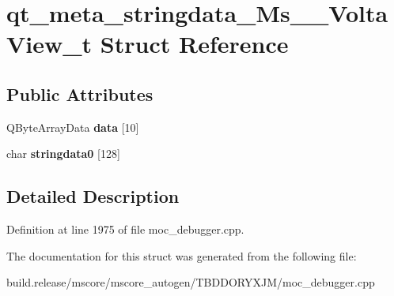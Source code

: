 \hypertarget{structqt__meta__stringdata___ms_____volta_view__t}{}\section{qt\+\_\+meta\+\_\+stringdata\+\_\+\+Ms\+\_\+\+\_\+\+Volta\+View\+\_\+t Struct Reference}
\label{structqt__meta__stringdata___ms_____volta_view__t}
\subsection*{Public Attributes}
\begin{DoxyCompactItemize}
\item 
\mbox{\label{structqt__meta__stringdata___ms_____volta_view__t_a91dc140ea4571e1aa9662913749326c9}} 
Q\+Byte\+Array\+Data {\bfseries data} \mbox{[}10\mbox{]}
\item 
\mbox{\label{structqt__meta__stringdata___ms_____volta_view__t_adb4da72eb58e6c949c990adff2952a97}} 
char {\bfseries stringdata0} \mbox{[}128\mbox{]}
\end{DoxyCompactItemize}


\subsection{Detailed Description}


Definition at line 1975 of file moc\+\_\+debugger.\+cpp.



The documentation for this struct was generated from the following file\+:\begin{DoxyCompactItemize}
\item 
build.\+release/mscore/mscore\+\_\+autogen/\+T\+B\+D\+D\+O\+R\+Y\+X\+J\+M/moc\+\_\+debugger.\+cpp\end{DoxyCompactItemize}
